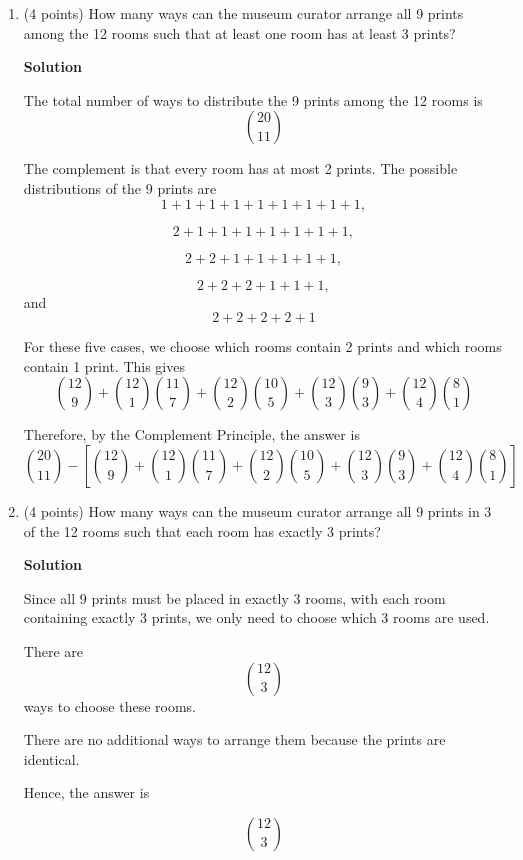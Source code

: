 \documentclass[10pt,letterpaper,unboxed,cm]{article}
\begin{document}
\begin{enumerate}
\begin{enumerate}
The 9 prints can be distributed between these 2 rooms in
\[\binom{10}{1}-2\]
ways. We subtract 2 because the cases where either room gets all 9
prints would be invalid, since we are counting for non-empty rooms.

Therefore, the answer is
\[\boxed{\binom{20}{11}-[\binom{12}{1}+\binom{12}{2}\left(\binom{10}{1}-2\right)]}\]

\item
(4 points)
How many ways can the museum curator arrange all 9 prints among the 12 rooms such that at least one room has at least 3 prints?

\textbf{Solution}

The total number of ways to distribute the 9 prints among the 12 rooms is
\[\binom{20}{11}\]

The complement is that every room has at most 2 prints. The possible
distributions of the 9 prints are
\[1+1+1+1+1+1+1+1+1,\]

\[2+1+1+1+1+1+1+1,\]

\[2+2+1+1+1+1+1,\]

\[2+2+2+1+1+1,\]
and
\[ 2+2+2+2+1\]

For these five cases, we choose which rooms contain 2 prints and which
rooms contain 1 print. This gives
\[
\binom{12}{9}
+\binom{12}{1}\binom{11}{7}
+\binom{12}{2}\binom{10}{5}
+\binom{12}{3}\binom{9}{3}
+\binom{12}{4}\binom{8}{1}
\]

Therefore, by the Complement Principle, the answer is
\[
\boxed{\binom{20}{11} -
[\binom{12}{9}
+\binom{12}{1}\binom{11}{7}
+\binom{12}{2}\binom{10}{5}
+\binom{12}{3}\binom{9}{3}
+\binom{12}{4}\binom{8}{1}
]}\]


\item
(4 points)
How many ways can the museum curator arrange all 9 prints in 3 of the 12 rooms such that each room has exactly 3 prints? 

\textbf{Solution}

Since all 9 prints must be placed in exactly 3 rooms, with each room
containing exactly 3 prints, we only need to choose which 3 rooms are used.

There are
\[\binom{12}{3}\]
ways to choose these rooms.

There are no additional ways to arrange them because the prints are identical.

Hence, the answer is

\[\boxed{\binom{12}{3}}\]

\end{enumerate}
  







\end{enumerate}
\end{document}
